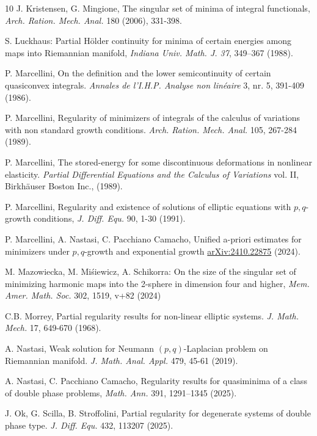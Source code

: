 \documentclass[a4paper]{amsart}
\theoremstyle{plain}  %
\numberwithin{equation}{section}
\begin{document}
\begin{thebibliography}{10}
 J. Kristensen, G. Mingione, The singular set of minima of integral functionals, \emph{Arch. Ration. Mech. Anal.} 180 (2006), 331-398.



S. Luckhaus: Partial H\"older continuity for minima of certain energies among maps into Riemannian manifold, \emph{Indiana Univ. Math. J. 37}, 349–367 (1988).

 P. Marcellini, On the definition and the lower semicontinuity of certain quasiconvex integrals. \emph{Annales de l'I.H.P. Analyse non lin\'eaire} 3, nr. 5, 391-409 (1986).


 P. Marcellini, Regularity of minimizers of integrals of the calculus of variations with non standard growth conditions. \emph{Arch. Ration. Mech. Anal.} 105, 267-284 (1989).


 P. Marcellini, The stored-energy for some discontinuous deformations in nonlinear elasticity. 
\emph{Partial Differential Equations and the Calculus of Variations} vol. II, Birkh\"auser Boston Inc., (1989).

 P. Marcellini, Regularity and
existence of solutions of elliptic equations with $p,q$-growth
conditions, \emph{J. Diff. Equ.} 90, 1-30 (1991).


 P. Marcellini, A. Nastasi, C. Pacchiano Camacho, Unified a-priori estimates for minimizers under $p,q$-growth and exponential growth \href{https://arxiv.org/abs/2410.22875}{	arXiv:2410.22875} (2024).

 M. Mazowiecka, M. Mi\'{s}iewicz, A. Schikorra: On the size of the singular set of minimizing harmonic maps into the 2-sphere in dimension four and higher, \emph{Mem. Amer. Math. Soc. } 302, 1519, v+82 (2024)

 C.B. Morrey, Partial regularity results for non-linear elliptic systems. \emph{J. Math. Mech.} 17, 649-670 (1968).

 A. Nastasi, Weak solution for Neumann $(p,q)$-Laplacian problem on Riemannian manifold. \emph{J. Math. Anal. Appl.} 479, 45-61 (2019).

 A. Nastasi, C. Pacchiano Camacho, Regularity results for quasiminima of a class of double phase problems, \emph{Math. Ann.} 391, 1291–1345 (2025).

 J. Ok, G. Scilla, B. Stroffolini, Partial regularity for degenerate systems of double phase type. \emph{J. Diff. Equ.} 432, 113207 (2025).




\end{thebibliography}
\end{document}

